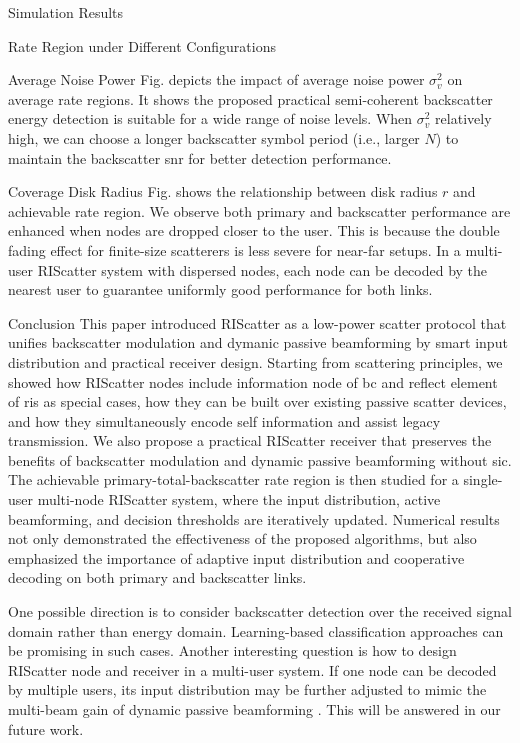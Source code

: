 \documentclass[journal]{IEEEtran}
\begin{document}
\begin{section}{Simulation Results}
\begin{subsection}{Rate Region under Different Configurations}
		\begin{subsubsection}{Average Noise Power}
			Fig.  depicts the impact of average noise power $\sigma_v^2$ on average rate regions.
			It shows the proposed practical semi-coherent backscatter energy detection is suitable for a wide range of noise levels.
			When $\sigma_v^2$ relatively high, we can choose a longer backscatter symbol period (i.e., larger $N$) to maintain the backscatter \gls{snr} for better detection performance.
		\end{subsubsection}

		\begin{subsubsection}{Coverage Disk Radius}
			Fig.  shows the relationship between disk radius $r$ and achievable rate region.
			We observe both primary and backscatter performance are enhanced when nodes are dropped closer to the user.
			This is because the double fading effect for finite-size scatterers is less severe for near-far setups.
			In a multi-user RIScatter system with dispersed nodes, each node can be decoded by the nearest user to guarantee uniformly good performance for both links.
		\end{subsubsection}
	\end{subsection}
	\label{st:simulation_results}
\end{section}

\begin{section}{Conclusion}
	This paper introduced RIScatter as a low-power scatter protocol that unifies backscatter modulation and dymanic passive beamforming by smart input distribution and practical receiver design.
	Starting from scattering principles, we showed how RIScatter nodes include information node of \gls{bc} and reflect element of \gls{ris} as special cases, how they can be built over existing passive scatter devices, and how they simultaneously encode self information and assist legacy transmission.
	We also propose a practical RIScatter receiver that preserves the benefits of backscatter modulation and dynamic passive beamforming without \gls{sic}.
	The achievable primary-total-backscatter rate region is then studied for a single-user multi-node RIScatter system, where the input distribution, active beamforming, and decision thresholds are iteratively updated.
	Numerical results not only demonstrated the effectiveness of the proposed algorithms, but also emphasized the importance of adaptive input distribution and cooperative decoding on both primary and backscatter links.

	One possible direction is to consider backscatter detection over the received signal domain rather than energy domain.
	Learning-based classification approaches can be promising in such cases.
	Another interesting question is how to design RIScatter node and receiver in a multi-user system.
	If one node can be decoded by multiple users, its input distribution may be further adjusted to mimic the multi-beam gain of dynamic passive beamforming \cite{Qiu2022}.
	This will be answered in our future work.
\end{section}
\end{document}
